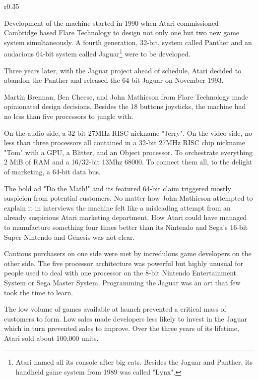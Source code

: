 \begin{wrapfigure}[5]{r}{0.35\textwidth}{
\centering {}}
\end{wrapfigure}
Development of the machine started in 1990 when Atari commissioned Cambridge based Flare Technology to design not only one but two new game system simultaneously. A fourth generation, 32-bit, system called Panther and an audacious 64-bit system called Jaguar\footnote{Atari named all its console after big cats. Besides the Jaguar and Panther, its handheld game system from 1989 was called "Lynx".} were to be developed.\\
\par Three years later, with the Jaguar project ahead of schedule, Atari decided to abandon the Panther and released the 64-bit Jaguar on November 1993.\\
\par
{}
\par
Martin Brennan, Ben Cheese, and John Mathieson from Flare Technology made opinionated design decisions. Besides the 18 buttons joysticks, the machine had no less than five processors to jungle with.\\
\par
On the audio side, a 32-bit 27MHz RISC nickname "Jerry". On the video side, no less than three processors all contained in a 32-bit 27MHz RISC chip nickname "Tom" with a GPU, a Blitter, and an Object processor. To orchestrate everything 2 MiB of RAM and a 16/32-bit 13Mhz 68000. To connect them all, to the delight of marketing, a 64-bit data bus.\\
\par
The bold ad "Do the Math!" and its featured 64-bit claim triggered mostly suspicion from potential customers.  No matter how John Mathieson attempted to explain it in interviews the machine felt like a misleading attempt from an already suspicious Atari marketing department. How Atari could have managed to manufacture something four times better than its Nintendo and Sega's 16-bit Super Nintendo and Genesis was not clear.
\par
Cautious purchasers on one side were met by incredulous game developers on the other side. The five processor architecture was powerful but highly unusual for people used to deal with one processor on the 8-bit Nintendo Entertainment System or Sega Master System. Programming the Jaguar was an art that few took the time to learn.\\
\par
The low volume of games available at launch prevented a critical mass of customers to form. Low sales made developers less likely to invest in the Jaguar which in turn prevented sales to improve. Over the three years of its lifetime, Atari sold about 100,000 units. 


